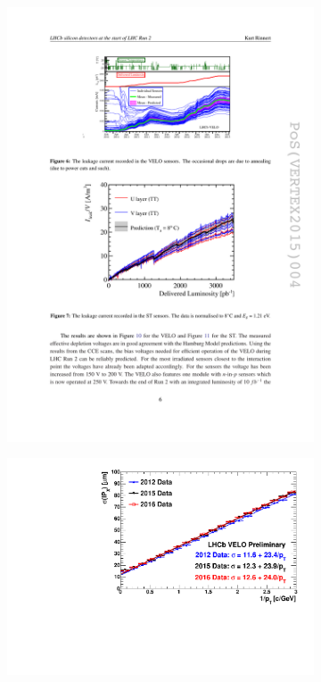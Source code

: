 \begin{figure}[!h]
    \centering
    \begin{subfigure}[m]{0.55\textwidth}
        \centering
        \includegraphics[width=1.0\textwidth]{figs/Detector/velo_leakage_current.pdf}
    \end{subfigure}
    \begin{subfigure}[m]{0.4\textwidth}
        \centering
        \includegraphics[width=1.0\textwidth]{figs/Detector/velo_ip_2016_2015_2012.pdf}

\end{subfigure}
\end{figure}

